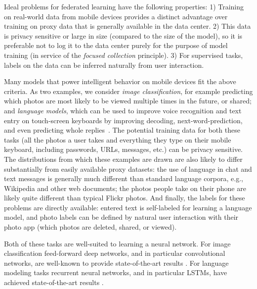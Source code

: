 \documentclass[twoside]{article}
\begin{document}
Ideal problems for federated learning have the following properties:
1) Training on real-world data from mobile devices provides a distinct
advantage over training on proxy data that is generally available in
the data center. 2) This data is privacy sensitive or large in size
(compared to the size of the model), so it is preferable not to log it
to the data center purely for the purpose of model training (in
service of the \textit{focused collection} principle).
3) For supervised tasks, labels on the data can be inferred naturally
from user interaction.


Many models that power intelligent behavior on mobile devices fit the
above criteria. As two examples, we consider \emph{image
  classification}, for example predicting which photos are most likely
to be viewed multiple times in the future, or shared; and \emph{language
  models}, which can be used to improve voice recognition and text
entry on touch-screen keyboards by improving decoding,
next-word-prediction, and even predicting whole
replies~\citep{corrado15computer}.
The potential training data for both these tasks (all the photos a
user takes and everything they type on their mobile keyboard,
including passwords, URLs, messages, etc.) can be privacy sensitive.
The distributions from which these examples are drawn are also likely
to differ substantially from easily available proxy datasets: the use
of language in chat and text messages is generally much different than
standard language corpora, e.g., Wikipedia and other web documents; the photos people take on their phone are likely
quite different than typical Flickr photos. And finally, the labels
for these problems are directly available: entered text is
self-labeled for learning a language model, and photo labels can be
defined by natural user interaction with their photo app (which photos
are deleted, shared, or viewed).

Both of these tasks are well-suited to learning a neural network. For
image classification feed-forward deep networks, and in
particular convolutional networks, are well-known to provide
state-of-the-art results
\citep{lecun98gradientbased,krizhevsky12imagenet}. For language
modeling tasks recurrent neural networks, and in particular LSTMs,
have achieved state-of-the-art results
\citep{hochreiter97lstm,bengio03neural,kim15character}.
\end{document}
